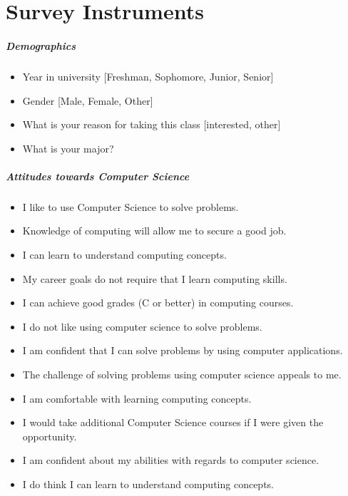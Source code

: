 \chapter*{Survey Instruments}
\label{surveyInstrument}

\paragraph * {Demographics}\mbox{} 
\begin{itemize}
\item Year in university [Freshman, Sophomore, Junior, Senior]
\item Gender [Male, Female, Other]
\item What is your reason for taking this class [interested, other]
\item What is your major?
\end{itemize}

\paragraph * {Attitudes towards Computer Science}\mbox{}
\begin{itemize}
\item I like to use Computer Science to solve problems.
\item Knowledge of computing will allow me to secure a good job.
\item I can learn to understand computing concepts.
\item My career goals do not require that I learn computing skills.
\item I can achieve good grades (C or better) in computing courses.
\item I do not like using computer science to solve problems.
\item I am confident that I can solve problems by using computer applications.
\item The challenge of solving problems using computer science appeals to me.
\item I am comfortable with learning computing concepts.
\item I would take additional Computer Science courses if I were given the opportunity.
\item I am confident about my abilities with regards to computer science.
\item I do think I can learn to understand computing concepts.
\end{itemize}

